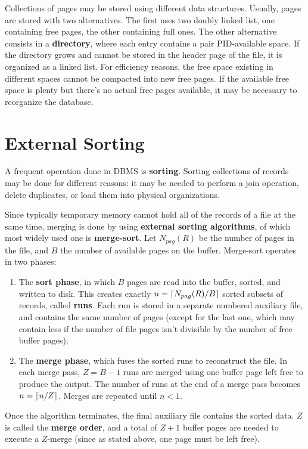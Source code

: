 Collections of pages may be stored using different data structures. Usually, pages are stored with two alternatives. The first uses two doubly linked list, one containing free pages, the other containing full ones. The other alternative consists in a \textbf{directory}, where each entry contains a pair PID-available space. If the directory grows and cannot be stored in the header page of the file, it is organized as a linked list. For efficiency reasons, the free space existing in different spaces cannot be compacted into new free pages. If the available free space is plenty but there's no actual free pages available, it may be necessary to reorganize the database.

\section{External Sorting}

A frequent operation done in DBMS is \textbf{sorting}. Sorting collections of records may be done for different reasons: it may be needed to perform a join operation, delete duplicates, or load them into physical organizations.

Since typically temporary memory cannot hold all of the records of a file at the same time, merging is done by using \textbf{external sorting algorithms}, of which most widely used one is \textbf{merge-sort}. Let $N_{pag}(R)$ be the number of pages in the file, and $B$ the number of available pages on the buffer. Merge-sort operates in two phases:
\begin{enumerate}
    \item The \textbf{sort phase}, in which $B$ pages are read into the buffer, sorted, and written to disk. This creates exactly $n = \left\lceil N_{pag}(R) / B\right\rceil$ sorted subsets of records, called \textbf{runs}. Each run is stored in a separate numbered auxiliary file, and contains the same number of pages (except for the last one, which may contain less if the number of file pages isn't divisible by the number of free buffer pages);

    \item The \textbf{merge phase}, which fuses the sorted runs to reconstruct the file. In each merge pass, $Z = B-1$ runs are merged using one buffer page left free to produce the output. The number of runs at the end of a merge pass becomes $n = \left\lceil n/Z\right\rceil$. Merges are repeated until $n < 1$.
\end{enumerate}
Once the algorithm terminates, the final auxiliary file contains the sorted data. $Z$ is called the \textbf{merge order}, and a total of $Z + 1$ buffer pages are needed to execute a $Z$-merge (since as stated above, one page must be left free).

